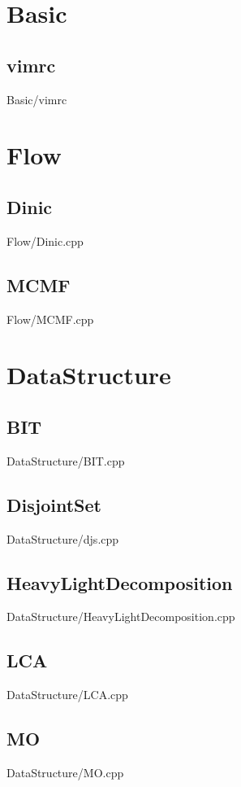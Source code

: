 \section{Basic}
    \subsection{vimrc}
         {Basic/vimrc}

\section{Flow}
    \subsection{Dinic}
         {Flow/Dinic.cpp}
    \subsection{MCMF}
         {Flow/MCMF.cpp}

\section{DataStructure}
    \subsection{BIT}
         {DataStructure/BIT.cpp}
    \subsection{DisjointSet}
         {DataStructure/djs.cpp}
    \subsection{HeavyLightDecomposition}
         {DataStructure/HeavyLightDecomposition.cpp}
    \subsection{LCA}
         {DataStructure/LCA.cpp}
    \subsection{MO}
         {DataStructure/MO.cpp}
